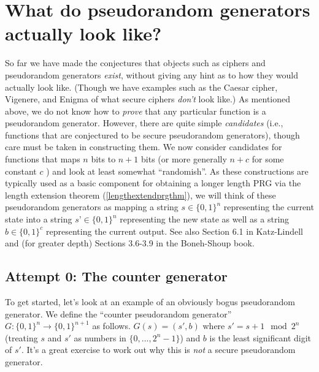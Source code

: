 \section{What do pseudorandom generators actually look
like?}\label{3-What-do-pseudorandom-g}

So far we have made the conjectures that objects such as ciphers and
pseudorandom generators \emph{exist}, without giving any hint as to how
they would actually look like. (Though we have examples such as the
Caesar cipher, Vigenere, and Enigma of what secure ciphers \emph{don't}
look like.) As mentioned above, we do not know how to \emph{prove} that
any particular function is a pseudorandom generator. However, there are
quite simple \emph{candidates} (i.e., functions that are conjectured to
be secure pseudorandom generators), though care must be taken in
constructing them. We now consider candidates for functions that maps
\(n\) bits to \(n+1\) bits (or more generally \(n+c\) for some constant
\(c\) ) and look at least somewhat ``randomish''. As these constructions
are typically used as a basic component for obtaining a longer length
PRG via the length extension theorem (\cref{lengthextendprgthm}), we
will think of these pseudorandom generators as mapping a string
\(s\in\{0,1\}^n\) representing the current state into a string
\(s’\in\{0,1\}^n\) representing the new state as well as a string
\(b\in\{0,1\}^c\) representing the current output. See also Section 6.1
in Katz-Lindell and (for greater depth) Sections 3.6-3.9 in the
Boneh-Shoup book.

\subsection{Attempt 0: The counter
generator}\label{3-Attempt--The-counter-g}

To get started, let's look at an example of an obviously bogus
pseudorandom generator. We define the ``counter pseudorandom generator''
\(G:\{0,1\}^n \rightarrow \{0,1\}^{n+1}\) as follows. \(G(s)=(s',b)\)
where \(s' = s + 1 \mod 2^n\) (treating \(s\) and \(s'\) as numbers in
\(\{0,\ldots,2^n-1\}\)) and \(b\) is the least significant digit of
\(s'\). It's a great exercise to work out why this is \emph{not} a
secure pseudorandom generator.


